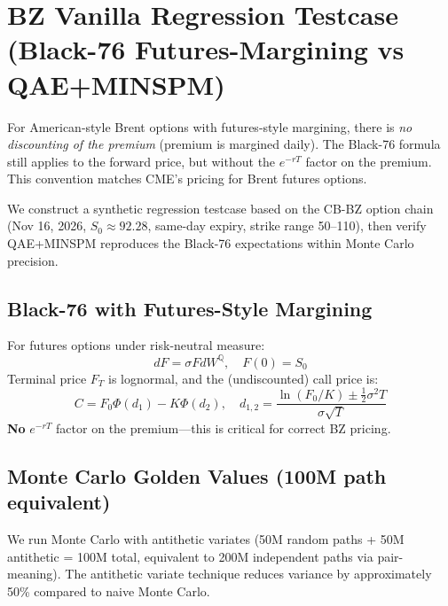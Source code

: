 \documentclass[11pt,a4paper]{article}
\begin{document}
\section{BZ Vanilla Regression Testcase (Black-76 Futures-Margining vs QAE+MINSPM)}
\label{sec:bz_vanilla}
For American-style Brent options with futures-style margining, there is \emph{no discounting of the premium} (premium is margined daily). The Black-76 formula still applies to the forward price, but without the $e^{-rT}$ factor on the premium. This convention matches CME's pricing for Brent futures options.

We construct a synthetic regression testcase based on the CB-BZ option chain (Nov 16, 2026, $S_0 \approx 92.28$, same-day expiry, strike range 50–110), then verify QAE+MINSPM reproduces the Black-76 expectations within Monte Carlo precision.

\subsection{Black-76 with Futures-Style Margining}
For futures options under risk-neutral measure:
\[
dF = \sigma F dW^{\mathbb{Q}}, \quad F(0) = S_0
\]
Terminal price $F_T$ is lognormal, and the (undiscounted) call price is:
\[
C = F_0 \Phi(d_1) - K \Phi(d_2), \quad d_{1,2} = \frac{\ln(F_0/K) \pm \frac{1}{2}\sigma^2 T}{\sigma\sqrt{T}}
\]
\textbf{No} $e^{-rT}$ factor on the premium—this is critical for correct BZ pricing.

\subsection{Monte Carlo Golden Values (100M path equivalent)}
We run Monte Carlo with antithetic variates (50M random paths + 50M antithetic = 100M total, equivalent to 200M independent paths via pair-meaning). The antithetic variate technique reduces variance by approximately 50\% compared to naive Monte Carlo.
\end{document}
